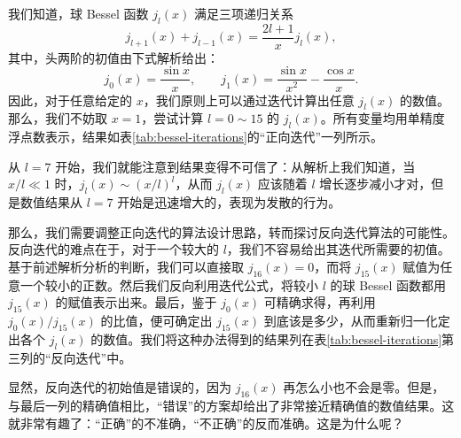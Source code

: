 我们知道，球 Bessel 函数 $j_l(x)$ 满足三项递归关系
\begin{equation}
j_{l+1}(x)+j_{l-1}(x)=\frac{2l+1}{x}j_l(x),
\tag{1.1.6}
\end{equation}
其中，头两阶的初值由下式解析给出：
\begin{equation}
j_0(x)=\frac{\sin x}{x},\qquad j_1(x)=\frac{\sin x}{x^2}-\frac{\cos x}{x}.
\tag{1.1.7}
\end{equation}
因此，对于任意给定的 $x$，我们原则上可以通过迭代计算出任意 $j_l(x)$ 的数值。那么，我们不妨取 $x=1$，尝试计算 $l=0\sim 15$ 的 $j_l(x)$。所有变量均用单精度浮点数表示，结果如表\ref{tab:bessel-iterations}的“正向迭代”一列所示。

从 $l=7$ 开始，我们就能注意到结果变得不可信了：从解析上我们知道，当 $x/l\ll 1$ 时，$j_l(x)\sim(x/l)^l$，从而 $j_l(x)$ 应该随着 $l$ 增长逐步减小才对，但是数值结果从 $l=7$ 开始是迅速增大的，表现为发散的行为。

那么，我们需要调整正向迭代的算法设计思路，转而探讨反向迭代算法的可能性。反向迭代的难点在于，对于一个较大的 $l$，我们不容易给出其迭代所需要的初值。基于前述解析分析的判断，我们可以直接取 $j_{16}(x)=0$，而将 $j_{15}(x)$ 赋值为任意一个较小的正数。然后我们反向利用迭代公式，将较小 $l$ 的球 Bessel 函数都用 $j_{15}(x)$ 的赋值表示出来。最后，鉴于 $j_0(x)$ 可精确求得，再利用 $j_0(x)/j_{15}(x)$ 的比值，便可确定出 $j_{15}(x)$ 到底该是多少，从而重新归一化定出各个 $j_l(x)$ 的数值。我们将这种办法得到的结果列在表\ref{tab:bessel-iterations}第三列的“反向迭代”中。

显然，反向迭代的初始值是错误的，因为 $j_{16}(x)$ 再怎么小也不会是零。但是，与最后一列的精确值相比，“错误”的方案却给出了非常接近精确值的数值结果。这就非常有趣了：“正确”的不准确，“不正确”的反而准确。这是为什么呢？

